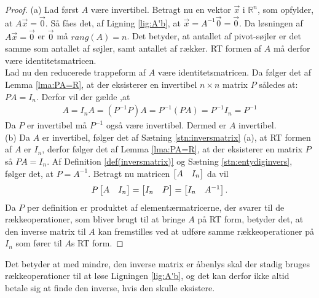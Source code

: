 \begin{proof}
(a) Lad først $A$ være invertibel. 
Betragt nu en vektor $\vec{x}$ i $\mathds{R}^n$, som opfylder, at $A\vec{x}=\vec{0}$.
Så fåes det, af Ligning \eqref{lig:A'b}, at $\vec{x}=A^{-1} \vec{0}=\vec{0}$.
Da løsningen af  $A\vec{x}=\vec{0}$ er $\vec{0}$ må $rang(A)=n$.
Det betyder, at antallet af pivot-søjler er det samme som antallet af søjler, samt antallet af rækker. 
RT formen af $A$ må derfor være identitetsmatricen. 
\\%
Lad nu den reducerede trappeform af $A$ være identitetsmatricen.
Da følger det af Lemma \ref{lma:PA=R}, at der eksisterer en invertibel $n \times n$  matrix $P$ således at: $PA=I_n$.
Derfor vil der gælde ,at
\begin{align*}
A=I_nA=(P^{-1}P)A=P^{-1}(PA)=P^{-1}I_n=P^{-1}
\end{align*}
Da $P$ er invertibel må $P^{-1}$ også være invertibel. 
Dermed er $A$ invertibel. 
\\ %
(b) Da $A$ er invertibel, følger det af Sætning \ref{stn:inversmatrix} (a), at RT formen af $A$ er $I_n$, derfor følger det af Lemma \ref{lma:PA=R}, at der eksisterer en matrix $P$ så $PA = I_n$. 
Af Definition \ref{def(inversmatrix)} og Sætning \ref{stn:entydiginvers}, følger det, at $P = A^{-1}$.
Betragt nu matricen $\begin{bmatrix} A&I_n \end{bmatrix}$ da vil
\begin{align*}
P \begin{bmatrix} A & I_n \end{bmatrix} = \begin{bmatrix} I_n & P \end{bmatrix} = \begin{bmatrix} I_n & A^{-1} \end{bmatrix}.
\end{align*}
Da $P$ per definition er produktet af elementærmatricerne, der svarer til de rækkeoperationer, som bliver brugt til at bringe $A$ på RT form, betyder det, at den inverse matrix til $A$ kan fremstilles ved at udføre samme rækkeoperationer på $I_n$ som fører til $A$s RT form.
\end{proof}
Det betyder at med mindre, den inverse matrix er åbenlys skal der stadig bruges rækkeoperationer til at løse Ligningen \eqref{lig:A'b}, og det kan derfor ikke altid betale sig at finde den inverse, hvis den skulle eksistere.





